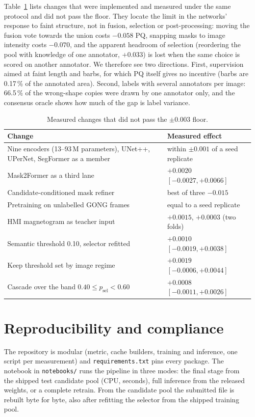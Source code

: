 \documentclass[sigconf]{acmart}
\begin{document}
Table~\ref{tab:negative} lists changes that were implemented and measured under the same protocol and did not pass the floor. They locate the limit in the networks' response to faint structure, not in fusion, selection or post-processing: moving the fusion vote towards the union costs $-0.058$ PQ, snapping masks to image intensity costs $-0.070$, and the apparent headroom of selection (reordering the pool with knowledge of one annotator, $+0.033$) is lost when the same choice is scored on another annotator. We therefore see two directions. First, supervision aimed at faint length and barbs, for which PQ itself gives no incentive (barbs are 0.17\,\% of the annotated area). Second, labels with several annotators per image: 66.5\,\% of the wrong-shape copies were drawn by one annotator only, and the consensus oracle shows how much of the gap is label variance.

\begin{table}[t]
  \caption{Measured changes that did not pass the $\pm0.003$ floor.}
  \label{tab:negative}
  \small
  \begin{tabular}{@{}p{}p{}@{}}
    \toprule
    Change & Measured effect \\
    \midrule
    Nine encoders (13--93\,M parameters), UNet++, UPerNet, SegFormer as a member & within $\pm0.001$ of a seed replicate \\
    Mask2Former as a third lane & $+0.0020$ $[-0.0027, +0.0066]$ \\
    Candidate-conditioned mask refiner & best of three $-0.015$ \\
    Pretraining on unlabelled GONG frames & equal to a seed replicate \\
    HMI magnetogram as teacher input & $+0.0015$, $+0.0003$ (two folds) \\
    Semantic threshold 0.10, selector refitted & $+0.0010$ $[-0.0019, +0.0038]$ \\
    Keep threshold set by image regime & $+0.0019$ $[-0.0006, +0.0044]$ \\
    Cascade over the band $0.40\leq p_\mathrm{sel}<0.60$ & $+0.0008$ $[-0.0011, +0.0026]$ \\
    \bottomrule
  \end{tabular}
\end{table}

\section{Reproducibility and compliance}\label{sec:repro}
The repository is modular (metric, cache builders, training and inference, one script per measurement) and \texttt{requirements.txt} pins every package. The notebook in \texttt{notebooks/} runs the pipeline in three modes: the final stage from the shipped test candidate pool (CPU, seconds), full inference from the released weights, or a complete retrain. From the candidate pool the submitted file is rebuilt byte for byte, also after refitting the selector from the shipped training pool.
\end{document}
